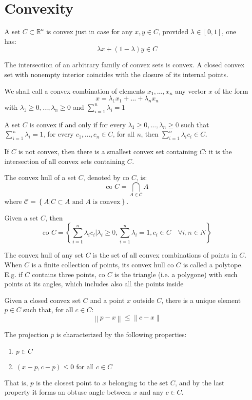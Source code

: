 \section{Convexity}

\begin{definition}
    A set $C \subset \mathbb{R}^n$ is convex just in case for any $x, y \in C$, provided $\lambda \in [0, 1]$, one has:
    \[\lambda x + (1 - \lambda)y \in C\]
\end{definition}
The intersection of an arbitrary family of convex sets is convex. 
A closed convex set with nonempty interior coincides with the closure of its internal points.
\begin{definition}
    We shall call a convex combination of elements $x_1, \dots, x_n$ any vector $x$ of the form
    \[x = \lambda_1x_1 + \dots + \lambda_nx_n\]
    with $\lambda_1 \geq 0, \dots, \lambda_n \geq 0$ and $\sum_{i=1}^{n} \lambda_i = 1$
\end{definition}
\begin{proposition}
    A set $C$ is convex if and only if for every $\lambda_1 \geq 0, \dots, \lambda_n \geq 0$ such that $\sum_{i=1}^{n}\lambda_i = 1$, for every $c_1, \dots, c_n \in C$, for all $n$, then $\sum^n_{i=1} \lambda_i c_i \in C$.
\end{proposition}
If $C$ is not convex, then there is a smallest convex set containing $C$: it is the intersection of all convex sets containing $C$. 
\begin{definition}
    The convex hull of a set $C$, denoted by co $C$, is:
    \[\text{co }C =\bigcap_{A\in\mathcal{C}}A\]
    where $\mathcal{C} = \left\{A | C \subset A \text{ and } A \text{ is convex}\right\}$. 
\end{definition}
\begin{proposition}
    Given a set $C$, then 
    \[\text{co }C=\left\{\sum_{i=1}^{n}\lambda_ic_i|\lambda_i\geq 0,\sum_{i=1}^{n}\lambda_i=1,c_i\in C\quad\forall i, n\in N\right\}\]
\end{proposition}
The convex hull of any set $C$ is the set of all convex combinations of points in $C$.
When $C$ is a finite collection of points, its convex hull co $C$ is called a polytope.
E.g. if $C$ contains three points, co $C$ is the triangle (i.e. a polygone) with such points at its angles, which includes also all the points inside
\begin{theorem}
    Given a closed convex set $C$ and a point $x$ outside $C$, there is a unique element $p \in C$ such that, for all $c \in C$:
    \[\left\lVert p - x\right\rVert\leq\left\lVert c-x\right\rVert\]

    The projection $p$ is characterized by the following properties:
    \begin{enumerate}
        \item $p \in C$
        \item $(x - p, c - p) \leq 0 \text{ for all } c \in C$
    \end{enumerate}
\end{theorem}
That is, $p$ is the closest point to $x$ belonging to the set $C$, and by the last property it forms an obtuse angle between $x$ and any $c \in C$. 

